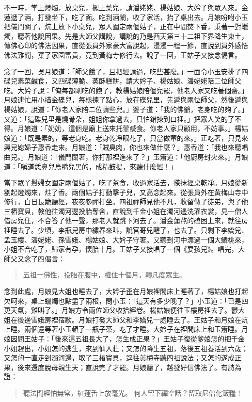 不一時，掌上燈燭，放桌兒，擺上菜兒，請潘姥姥、楊姑娘、大妗子與眾人來。金蓮遞了酒，打發坐下，吃了面。吃到酒闌，收了家活，抬了桌出去。月娘吩咐小玉把儀門關了，炕上放下小桌兒，眾人圍定兩個姑子，正在中間焚下香，秉著一對蠟燭，聽著他說因果。先是大師父講說，講說的乃是西天第三十二祖下界降生東土，傳佛心印的佛法因果，直從張員外家豪大富說起，漫漫一程一節，直說到員外感悟佛法難聞，棄了家園富貴，竟到黃梅寺修行去。說了一回，王姑子又接念偈言。

念了一回，吳月娘道：「師父餓了，且把經請過，吃些甚麼。」一面令小玉安排了四碟兒素菜鹹食，又四碟薄脆、蒸酥糕餅，請大妗子、楊姑娘、潘姥姥陪二位師父吃。大妗子說：「俺每都剛吃的飽了，教楊姑娘陪個兒罷，他老人家又吃著個齋。」月娘連忙用小描金碟兒，每樣揀了點心，放在碟兒里，先遞與兩位師父，然後遞與楊姑娘，說道：「你老人家陪二位請些兒。」婆子道：「我的佛爺，老身吃的夠了。」又道：「這碟兒里是燒骨朵，姐姐你拿過去，只怕錯揀到口裡。」把眾人笑的了不得。月娘道：「奶奶，這個是廟上送來托葷鹹食。你老人家只顧用，不妨事。」楊姑娘道：「既是素的，等老身吃。老身乾凈眼花了，只當做葷的來。」正吃著，只見來興兒媳婦子惠香走來。月娘道：「賊臭肉，你也來做什麼？」惠香道：「我也來聽唱曲兒。」月娘道：「儀門關著，你打那裡進來了？」玉簫道：「他廚房封火來。」月娘道：「嗔道恁鼻兒烏嘴兒黑的，成精鼓搗，來聽什麼經！」

當下眾丫鬟婦女圍定兩個姑子，吃了茶食，收過家活去，搽抹經桌乾凈。月娘從新剔起燈燭來，炷了香。兩個姑子打動擊子兒，又高念起來。從張員外在黃梅山寺中修行，白日長跪聽經，夜夜參禪打坐。四祖禪師見他不凡，收留做了徒弟，與了他三樁寶貝，教他往濁河邊投胎奪舍，直說到千金小姐在濁河邊洗濯衣裳，見一僧人借房兒住，不合答了他一聲，那老人就跳下河去了。潘金蓮熬的磕困上來，就往房裡睡去了。少頃，李瓶兒房中繡春來叫，說官哥兒醒了，也去了。只剩下李嬌兒、孟玉樓、潘姥姥、孫雪娥、楊姑娘、大妗子守著。又聽到河中漂過一個大鱗桃來，小姐不合吃了，歸家有孕，懷胎十月。王姑子又接唱了一個《耍孩兒》。唱完，大師父又念了四偈言：
\begin{quote}
五祖一佛性，投胎在腹中，權住十個月，轉凡度眾生。
\end{quote}

念到此處，月娘見大姐也睡去了，大妗子歪在月娘裡間床上睡著了，楊姑娘也打起欠呵來，桌上蠟燭也點盡了兩根，問小玉：「這天有多少晚了？」小玉道：「已是四更天氣，雞叫了。」月娘方令兩位師父收拾經卷。楊姑娘便往玉樓房裡去了。鬱大姐在後邊雪娥房裡宿歇。月娘打發大師父和李嬌兒一處睡去了。王姑子和月娘在炕上睡。兩個還等著小玉頓了一瓶子茶，吃了才睡。大妗子在裡間床上和玉簫睡。月娘因問王姑子：「後來這五祖長大了，怎生成正果？」王姑子復從爹娘怎的把千金小姐趕出，小姐怎的逃生，來到仙人莊；又怎的降生五祖，落後五祖養活到六歲；又怎的一直走到濁河邊，取了三樁寶貝，逕往黃梅寺聽四祖說法；又怎的遂成正果，後來還度脫母親生天；直說完了才罷。月娘聽了，越發好信佛法了。有詩為證：
\begin{quote}
聽法聞經怕無常，紅蓮舌上放毫光。
何人留下禪空話？留取尼僧化飯糧！
\end{quote}
